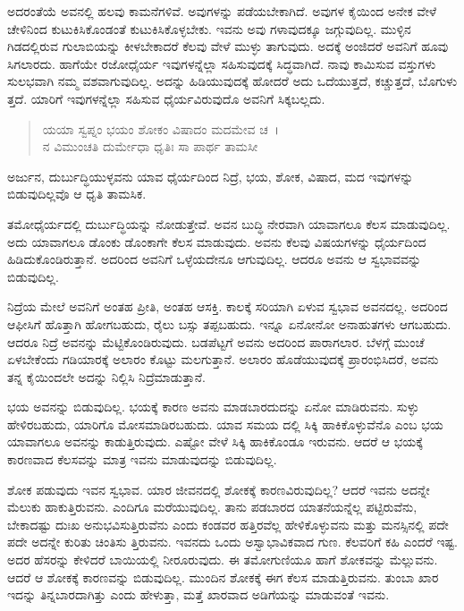ಅದರಂತೆಯೆ ಅವನಲ್ಲಿ ಹಲವು ಕಾಮನೆಗಳಿವೆ. ಅವುಗಳನ್ನು ಪಡೆಯಬೇಕಾಗಿದೆ. ಅವುಗಳ ಕೈಯಿಂದ ಅನೇಕ ವೇಳೆ ಚೇಳಿನಿಂದ ಕುಟುಕಿಸಿಕೊಂಡಂತೆ ಕುಟುಕಿಸಿಕೊಳ್ಳಬೇಕು. ಇವನು ಅವು ಗಳಾವುದಕ್ಕೂ ಜಗ್ಗುವುದಿಲ್ಲ. ಮುಳ್ಳಿನ ಗಿಡದಲ್ಲಿರುವ ಗುಲಾಬಿಯನ್ನು ಕೀಳಬೇಕಾದರೆ ಕೆಲವು ವೇಳೆ ಮುಳ್ಳು ತಾಗುವುದು. ಅದಕ್ಕೆ ಅಂಜಿದರೆ ಅವನಿಗೆ ಹೂವು ಸಿಗಲಾರದು. ಹಾಗೆಯೇ ರಜೋಧೈರ್ಯ ಇವುಗಳನ್ನೆಲ್ಲಾ ಸಹಿಸುವುದಕ್ಕೆ ಸಿದ್ಧವಾಗಿದೆ. ನಾವು ಕಾಮಿಸುವ ವಸ್ತುಗಳು ಸುಲಭವಾಗಿ ನಮ್ಮ ವಶವಾಗುವುದಿಲ್ಲ. ಅದನ್ನು ಹಿಡಿಯುವುದಕ್ಕೆ ಹೋದರೆ ಅದು ಒದೆಯುತ್ತದೆ, ಕಚ್ಚುತ್ತದೆ, ಬೊಗುಳು ತ್ತದೆ. ಯಾರಿಗೆ ಇವುಗಳನ್ನೆಲ್ಲಾ ಸಹಿಸುವ ಧೈರ್ಯವಿರುವುದೊ ಅವನಿಗೆ ಸಿಕ್ಕಬಲ್ಲದು.

\begin{verse}
ಯಯಾ ಸ್ವಪ್ನಂ ಭಯಂ ಶೋಕಂ ವಿಷಾದಂ ಮದಮೇವ ಚ~।\\ನ ವಿಮುಂಚತಿ ದುರ್ಮೇಧಾ ಧೃತಿಃ ಸಾ ಪಾರ್ಥ ತಾಮಸೀ 
\end{verse}

{\small ಅರ್ಜುನ, ದುರ್ಬುದ್ಧಿಯುಳ್ಳವನು ಯಾವ ಧೈರ್ಯದಿಂದ ನಿದ್ರೆ, ಭಯ, ಶೋಕ, ವಿಷಾದ, ಮದ ಇವುಗಳನ್ನು ಬಿಡುವುದಿಲ್ಲವೊ ಆ ಧೃತಿ ತಾಮಸಿಕ.}

ತಮೋಧೈರ್ಯದಲ್ಲಿ ದುರ್ಬುದ್ಧಿಯನ್ನು ನೋಡುತ್ತೇವೆ. ಅವನ ಬುದ್ಧಿ ನೇರವಾಗಿ ಯಾವಾಗಲೂ ಕೆಲಸ ಮಾಡುವುದಿಲ್ಲ. ಅದು ಯಾವಾಗಲೂ ಡೊಂಕು ಡೊಂಕಾಗೇ ಕೆಲಸ ಮಾಡುವುದು. ಅವನು ಕೆಲವು ವಿಷಯಗಳನ್ನು ಧೈರ್ಯದಿಂದ ಹಿಡಿದುಕೊಂಡಿರುತ್ತಾನೆ. ಅದರಿಂದ ಅವನಿಗೆ ಒಳ್ಳೆಯದೇನೂ ಆಗುವುದಿಲ್ಲ. ಆದರೂ ಅವನು ಆ ಸ್ವಭಾವವನ್ನು ಬಿಡುವುದಿಲ್ಲ.

ನಿದ್ರೆಯ ಮೇಲೆ ಅವನಿಗೆ ಅಂತಹ ಪ್ರೀತಿ, ಅಂತಹ ಆಸಕ್ತಿ. ಕಾಲಕ್ಕೆ ಸರಿಯಾಗಿ ಏಳುವ ಸ್ವಭಾವ ಅವನದಲ್ಲ. ಅದರಿಂದ ಆಫೀಸಿಗೆ ಹೊತ್ತಾಗಿ ಹೋಗಬಹುದು, ರೈಲು ಬಸ್ಸು ತಪ್ಪಬಹುದು. ಇನ್ನೂ ಏನೋನೋ ಅನಾಹುತಗಳು ಆಗಬಹುದು. ಆದರೂ ನಿದ್ರೆ ಅವನನ್ನು ಮೆಟ್ಟಿಕೊಂಡಿರುವುದು. ಬಡಪೆಟ್ಟಗೆ ಅವನು ಅದರಿಂದ ಪಾರಾಗಲಾರ. ಬೆಳಗ್ಗೆ ಮುಂಚೆ ಏಳಬೇಕೆಂದು ಗಡಿಯಾರಕ್ಕೆ ಅಲಾರಂ ಕೊಟ್ಟು ಮಲಗುತ್ತಾನೆ. ಅಲಾರಂ ಹೊಡೆಯುವುದಕ್ಕೆ ಪ್ರಾರಂಭಿಸಿದರೆ, ಅವನು ತನ್ನ ಕೈಯಿಂದಲೇ ಅದನ್ನು ನಿಲ್ಲಿಸಿ ನಿದ್ರೆಮಾಡುತ್ತಾನೆ.

ಭಯ ಅವನನ್ನು ಬಿಡುವುದಿಲ್ಲ. ಭಯಕ್ಕೆ ಕಾರಣ ಅವನು ಮಾಡಬಾರದುದನ್ನು ಏನೋ ಮಾಡಿರುವನು. ಸುಳ್ಳು ಹೇಳಿರಬಹುದು, ಯಾರಿಗೊ ಮೋಸಮಾಡಿರಬಹುದು. ಯಾವ ಸಮಯ ದಲ್ಲಿ ಸಿಕ್ಕಿ ಹಾಕಿಕೊಳ್ಳುವೆನೊ ಎಂಬ ಭಯ ಯಾವಾಗಲೂ ಅವನನ್ನು ಕಾಡುತ್ತಿರುವುದು. ಎಷ್ಟೋ ವೇಳೆ ಸಿಕ್ಕಿ ಹಾಕಿಕೊಂಡೂ ಇರುವನು. ಆದರೆ ಆ ಭಯಕ್ಕೆ ಕಾರಣವಾದ ಕೆಲಸವನ್ನು ಮಾತ್ರ ಇವನು ಮಾಡುವುದನ್ನು ಬಿಡುವುದಿಲ್ಲ.

ಶೋಕ ಪಡುವುದು ಇವನ ಸ್ವಭಾವ. ಯಾರ ಜೀವನದಲ್ಲಿ ಶೋಕಕ್ಕೆ ಕಾರಣವಿರುವುದಿಲ್ಲ? ಆದರೆ ಇವನು ಅದನ್ನೇ ಮೆಲುಕು ಹಾಕುತ್ತಿರುವನು. ಎಂದಿಗೂ ಮರೆಯುವುದಿಲ್ಲ. ತಾನು ಪಡಬಾರದ ಯಾತನೆಯನ್ನೆಲ್ಲ ಪಟ್ಟಿರುವೆನು, ಬೇಕಾದಷ್ಟು ದುಃಖ ಅನುಭವಿಸುತ್ತಿರುವೆನು ಎಂದು ಕಂಡವರ ಹತ್ತಿರವೆಲ್ಲ ಹೇಳಿಕೊಳ್ಳುವನು ಮತ್ತು ಮನಸ್ಸಿನಲ್ಲಿ ಪದೇ ಪದೇ ಅದನ್ನೇ ಕುರಿತು ಚಿಂತಿಸು ತ್ತಿರುವನು. ಇವನದು ಒಂದು ಅಸ್ವಾಭಾವಿಕವಾದ ಗುಣ. ಕೆಲವರಿಗೆ ಕಹಿ ಎಂದರೆ ಇಷ್ಟ. ಅದರ ಹೆಸರನ್ನು ಕೇಳಿದರೆ ಬಾಯಿಯಲ್ಲಿ ನೀರೂರುವುದು. ಈ ತಮೋಗುಣಿಯೂ ಹಾಗೆ ಶೋಕವನ್ನು ಮೆಲ್ಲುವನು. ಆದರೆ ಆ ಶೋಕಕ್ಕೆ ಕಾರಣವನ್ನು ಬಿಡುವುದಿಲ್ಲ. ಮುಂದಿನ ಶೋಕಕ್ಕೆ ಈಗ ಕೆಲಸ ಮಾಡುತ್ತಿರುವನು. ತುಂಬಾ ಖಾರ ಇದನ್ನು ತಿನ್ನಬಾರದಾಗಿತ್ತು ಎಂದು ಹೇಳುತ್ತಾ, ಮತ್ತೆ ಖಾರವಾದ ಅಡಿಗೆಯನ್ನು ಮಾಡುವಂತೆ ಇವನು.

